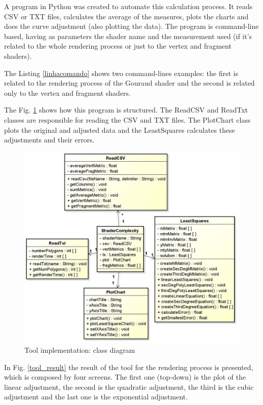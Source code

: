 \documentclass[10pt, conference, compsocconf]{IEEEtran}
\begin{document}
 A program in Python was created to automate this calculation process. It reads
CSV or TXT files, calculates the average of the measures, plots the charts and
does the curve adjustment (also plotting the data). The program is command-line
based, having as parameters the shader name and the measurement used (if it's
related to the whole rendering process or just to the vertex and fragment shaders).

 The Listing \ref{linhacomando} shows two command-lines examples: the first is related
to the rendering process of the Gouraud shader and the second is related
only to the vertex and fragment shaders.



 The Fig. \ref{python} shows how this program is structured.
The ReadCSV and ReadTxt classes are responsible for reading the CSV and TXT 
files. The PlotChart class plots the original and adjusted data and the 
LeastSquares calculates these adjustments and their errors.

	\begin{figure}[!t]
	\centering
		\includegraphics[keepaspectratio=true,scale=0.28]{minquad_diag.jpg}
	\caption{Tool implementation: class diagram}
	\label{python}
	\end{figure}

 In Fig. \ref{tool_result} the result of the tool for
the rendering process is presented, which is composed by four screens. 
The first one (top-down) is the plot of the linear adjustment, the second 
is the quadratic adjustment, the third is  the cubic  
adjustment and the last one is the exponential adjustment. 
\end{document}
